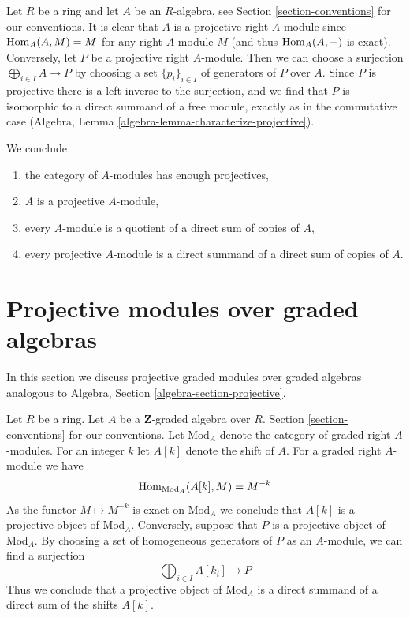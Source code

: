 \medskip\noindent
Let $R$ be a ring and let $A$ be an $R$-algebra, see
Section \ref{section-conventions} for our conventions.
It is clear that $A$ is a projective right $A$-module since
$\mathop{\mathrm{Hom}}\nolimits_A(A, M) = M$ for any right $A$-module $M$ (and thus $\mathop{\mathrm{Hom}}\nolimits_A(A, -)$
is exact). Conversely, let $P$ be a projective right $A$-module. Then
we can choose a surjection
$\bigoplus_{i \in I} A \to P$ by choosing a set $\{p_i\}_{i \in I}$
of generators of $P$ over $A$. Since $P$ is projective there is a
left inverse to the surjection, and we find that $P$ is isomorphic
to a direct summand of a free module, exactly as in the commutative case
(Algebra, Lemma \ref{algebra-lemma-characterize-projective}).

\medskip\noindent
We conclude
\begin{enumerate}
\item the category of $A$-modules has enough projectives,
\item $A$ is a projective $A$-module,
\item every $A$-module is a quotient of a direct sum of copies of $A$,
\item every projective $A$-module is a direct summand of a direct
sum of copies of $A$.
\end{enumerate}



\section{Projective modules over graded algebras}
\label{section-projectives-over-graded-algebras}

\noindent
In this section we discuss projective graded modules over graded algebras
analogous to Algebra, Section \ref{algebra-section-projective}.

\medskip\noindent
Let $R$ be a ring. Let $A$ be a $\mathbf{Z}$-graded algebra over $R$.
Section \ref{section-conventions} for our conventions.
Let $\text{Mod}_A$ denote the category of graded right $A$-modules.
For an integer $k$ let $A[k]$ denote the shift of $A$.
For a graded right $A$-module we have
$$
\mathop{\mathrm{Hom}}\nolimits_{\text{Mod}_A}(A[k], M) = M^{-k}
$$
As the functor $M \mapsto M^{-k}$ is exact on $\text{Mod}_A$ we
conclude that $A[k]$ is a projective object of $\text{Mod}_A$.
Conversely, suppose that $P$ is a projective object of $\text{Mod}_A$.
By choosing a set of homogeneous generators of $P$ as an $A$-module,
we can find a surjection
$$
\bigoplus\nolimits_{i \in I} A[k_i] \longrightarrow P
$$
Thus we conclude that a projective object of $\text{Mod}_A$ is
a direct summand of a direct sum of the shifts $A[k]$.

